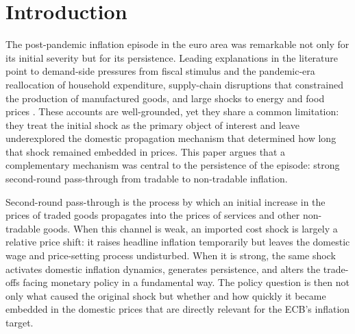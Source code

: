 \documentclass[a4paper,12pt]{article}
\begin{document}

\section{Introduction}


The post-pandemic inflation episode in the euro area was remarkable not only for its initial severity but for its persistence. Leading explanations in the literature point to demand-side pressures from fiscal stimulus and the pandemic-era reallocation of household expenditure, supply-chain disruptions that constrained the production of manufactured goods, and large shocks to energy and food prices \cite{BernankeBlanchardAEJM, DaoGourinchasLeighMishra2024}. These accounts are well-grounded, yet they share a common limitation: they treat the initial shock as the primary object of interest and leave underexplored the domestic propagation mechanism that determined how long that shock remained embedded in prices. This paper argues that a complementary mechanism was central to the persistence of the episode: strong second-round pass-through from tradable to non-tradable inflation.

Second-round pass-through is the process by which an initial increase in the prices of traded goods propagates into the prices of services and other non-tradable goods. When this channel is weak, an imported cost shock is largely a relative price shift: it raises headline inflation temporarily but leaves the domestic wage and price-setting process undisturbed. When it is strong, the same shock activates domestic inflation dynamics, generates persistence, and alters the trade-offs facing monetary policy in a fundamental way. The policy question is then not only what caused the original shock but whether and how quickly it became embedded in the domestic prices that are directly relevant for the ECB's inflation target.
\end{document}
